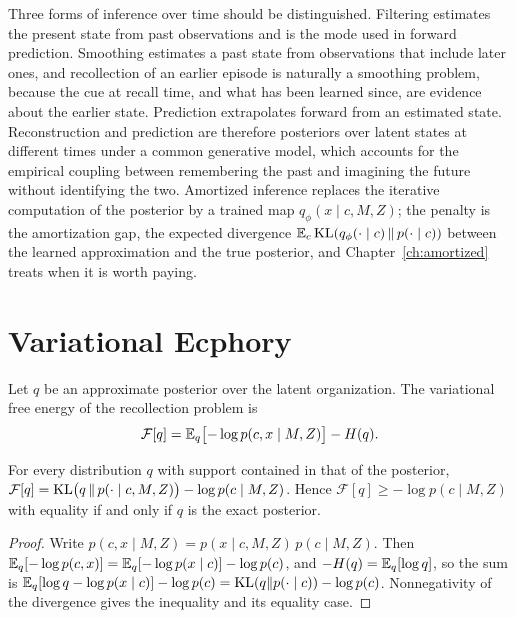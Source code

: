 Three forms of inference over time should be distinguished. Filtering estimates the present state from past observations and is the mode used in forward prediction. Smoothing estimates a past state from observations that include later ones, and recollection of an earlier episode is naturally a smoothing problem, because the cue at recall time, and what has been learned since, are evidence about the earlier state. Prediction extrapolates forward from an estimated state. Reconstruction and prediction are therefore posteriors over latent states at different times under a common generative model, which accounts for the empirical coupling between remembering the past and imagining the future without identifying the two. Amortized inference replaces the iterative computation of the posterior by a trained map $q_\phi(x\mid c,M,Z)$; the penalty is the amortization gap, the expected divergence $\mathbb{E}_c\operatorname{KL}(q_\phi(\cdot\mid c)\,\Vert\,p(\cdot\mid c))$ between the learned approximation and the true posterior, and Chapter~\ref{ch:amortized} treats when it is worth paying.

\chapter{Variational Ecphory}\label{ch:variational}

Let $q$ be an approximate posterior over the latent organization. The variational free energy of the recollection problem is
\begin{equation}\label{eq:vfe}
\mathcal F[q]=\mathbb{E}_q\bigl[-\log p(c,x\mid M,Z)\bigr]-H(q).
\end{equation}

\begin{proposition}\label{prop:vfe}
For every distribution $q$ with support contained in that of the posterior, $\mathcal F[q]=\operatorname{KL}\bigl(q\,\Vert\,p(\cdot\mid c,M,Z)\bigr)-\log p(c\mid M,Z)$. Hence $\mathcal F[q]\ge-\log p(c\mid M,Z)$ with equality if and only if $q$ is the exact posterior.
\end{proposition}

\begin{proof}
Write $p(c,x\mid M,Z)=p(x\mid c,M,Z)\,p(c\mid M,Z)$. Then $\mathbb{E}_q[-\log p(c,x)]=\mathbb{E}_q[-\log p(x\mid c)]-\log p(c)$, and $-H(q)=\mathbb{E}_q[\log q]$, so the sum is $\mathbb{E}_q[\log q-\log p(x\mid c)]-\log p(c)=\operatorname{KL}(q\Vert p(\cdot\mid c))-\log p(c)$. Nonnegativity of the divergence gives the inequality and its equality case.
\end{proof}


